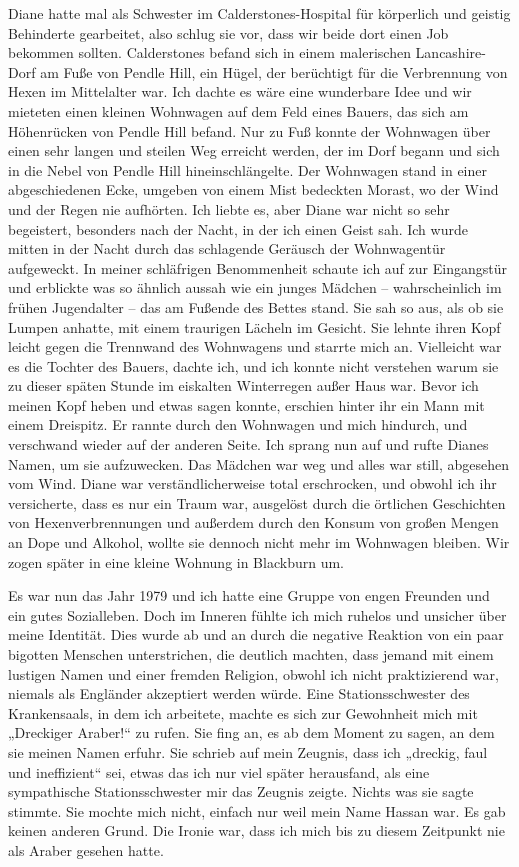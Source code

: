 \documentclass[12pt]{memoir}
\begin{document}
Diane hatte mal als Schwester im Calderstones-Hospital für körperlich
und geistig Behinderte gearbeitet, also schlug sie vor,
dass wir beide dort einen Job bekommen sollten.
Calderstones befand sich in einem malerischen Lancashire-Dorf
am Fuße von Pendle Hill, ein Hügel,
der berüchtigt für die Verbrennung von Hexen im Mittelalter war.
Ich dachte es wäre eine wunderbare Idee
und wir mieteten einen kleinen Wohnwagen auf dem Feld eines Bauers,
das sich am Höhenrücken von Pendle Hill befand.
Nur zu Fuß konnte der Wohnwagen über einen sehr langen
und steilen Weg erreicht werden,
der im Dorf begann und sich in die Nebel von Pendle Hill hineinschlängelte.
Der Wohnwagen stand in einer abgeschiedenen Ecke,
umgeben von einem Mist bedeckten Morast,
wo der Wind und der Regen nie aufhörten.
Ich liebte es, aber Diane war nicht so sehr begeistert,
besonders nach der Nacht, in der ich einen Geist sah.
Ich wurde mitten in der Nacht durch das schlagende Geräusch
der Wohnwagentür aufgeweckt.
In meiner schläfrigen Benommenheit schaute ich auf zur Eingangstür
und erblickte was so ähnlich aussah wie ein junges Mädchen –
wahrscheinlich im frühen Jugendalter –
das am Fußende des Bettes stand.
Sie sah so aus, als ob sie Lumpen anhatte,
mit einem traurigen Lächeln im Gesicht.
Sie lehnte ihren Kopf leicht gegen die Trennwand des Wohnwagens
und starrte mich an.
Vielleicht war es die Tochter des Bauers, dachte ich,
und ich konnte nicht verstehen warum sie zu dieser späten Stunde
im eiskalten Winterregen außer Haus war.
Bevor ich meinen Kopf heben und etwas sagen konnte,
erschien hinter ihr ein Mann mit einem Dreispitz.
Er rannte durch den Wohnwagen und mich hindurch,
und verschwand wieder auf der anderen Seite.
Ich sprang nun auf und rufte Dianes Namen, um sie aufzuwecken.
Das Mädchen war weg und alles war still, abgesehen vom Wind.
Diane war verständlicherweise total erschrocken,
und obwohl ich ihr versicherte, dass es nur ein Traum war,
ausgelöst durch die örtlichen Geschichten von Hexenverbrennungen
und außerdem durch den Konsum von großen Mengen an Dope und Alkohol,
wollte sie dennoch nicht mehr im Wohnwagen bleiben.
Wir zogen später in eine kleine Wohnung in Blackburn um.

Es war nun das Jahr 1979 und ich hatte eine Gruppe
von engen Freunden und ein gutes Sozialleben.
Doch im Inneren fühlte ich mich ruhelos und unsicher über meine Identität.
Dies wurde ab und an durch die negative Reaktion
von ein paar bigotten Menschen unterstrichen,
die deutlich machten, dass jemand mit einem lustigen Namen
und einer fremden Religion, obwohl ich nicht praktizierend war,
niemals als Engländer akzeptiert werden würde.
Eine Stationsschwester des Krankensaals, in dem ich arbeitete,
machte es sich zur Gewohnheit mich mit „Dreckiger Araber!“ zu rufen.
Sie fing an, es ab dem Moment zu sagen, an dem sie meinen Namen erfuhr.
Sie schrieb auf mein Zeugnis, dass ich „dreckig, faul und ineffizient“ sei,
etwas das ich nur viel später herausfand,
als eine sympathische Stationsschwester mir das Zeugnis zeigte.
Nichts was sie sagte stimmte.
Sie mochte mich nicht, einfach nur weil mein Name Hassan war.
Es gab keinen anderen Grund.
Die Ironie war, dass ich mich bis zu diesem Zeitpunkt
nie als Araber gesehen hatte.
\end{document}
